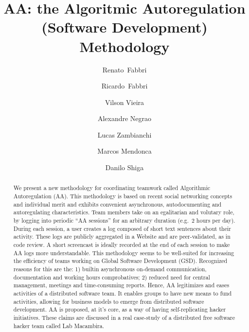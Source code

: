 \title{
    AA: the Algoritmic Autoregulation (Software Development) Methodology
}

\author{%
Renato~Fabbri \and Ricardo~Fabbri \and Vilson Vieira \and Alexandre Negrao \and Lucas Zambianchi
\and Marcos Mendonca \and Danilo Shiga
}

\maketitle

\begin{abstract}
We present a new methodology for coordinating
teamwork called Algorithmic Autoregulation (AA). This methodology is based on recent social networking concepts and individual merit and exhibits convenient asynchronous, autodocumenting and autoregulating characteristics. Team
members take on an egalitarian and volutary role, by logging into
periodic ``AA sessions'' for an arbitrary duration (e.g.\ 2 hours per day).
During each session, a user creates a log composed of short text sentences
about their activity. These logs are
publicly aggregated in a Website and are peer-validated, as in code
review. A short screencast is ideally recorded at the end of each session to make
AA logs more understandable. This methodology seems to be well-suited for
increasing the efficiency of teams working on
Global Software Development (GSD). Recognized reasons for this are
the: 1) builtin asynchronous
on-demand communication, documentation and working hours comprobatives;
2) reduced need for central management,
meetings and time-consuming reports. Hence, AA
legitimizes and eases activities of a distributed software team.  It
enables groups to have new means to fund activities,
allowing for business models to emerge from
distributed software development. AA is proposed,
at it's core, as a way of having self-replicating hacker initiatives. These claims are
discussed in a real case-study of a distributed free software
hacker team called Lab Macambira.
\end{abstract}

